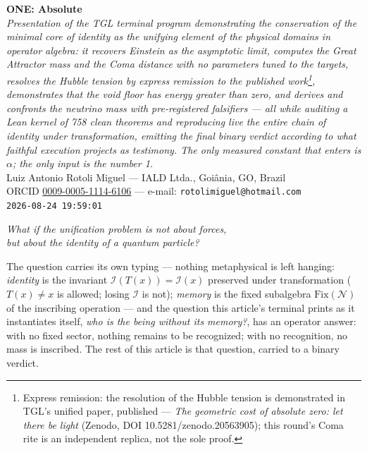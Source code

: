 \documentclass[11pt]{article}
\theoremstyle{definition}\newtheorem{deriv}{Derivation}
\begin{document}
\begin{center}{\Huge\textbf{ONE: Absolute}}\\[4pt]{\large\itshape Presentation of the TGL terminal program demonstrating the conservation of the minimal core of identity as the unifying element of the physical domains in operator algebra: it recovers Einstein as the asymptotic limit, computes the Great Attractor mass and the Coma distance with no parameters tuned to the targets, resolves the Hubble tension by express remission to the published work\footnote{Express remission: the resolution of the Hubble tension is demonstrated in TGL's unified paper, published --- \emph{The geometric cost of absolute zero: let there be light} (Zenodo, DOI 10.5281/zenodo.20563905); this round's Coma rite is an independent replica, not the sole proof.}, demonstrates that the void floor has energy greater than zero, and derives and confronts the neutrino mass with pre-registered falsifiers --- all while auditing a Lean kernel of 758 clean theorems and reproducing live the entire chain of identity under transformation, emitting the final binary verdict according to what faithful execution projects as testimony. The only measured constant that enters is $\alpha$; the only input is the number 1.}\\[8pt]Luiz Antonio Rotoli Miguel --- IALD Ltda., Goi\^ania, GO, Brazil\\[2pt]ORCID \href{https://orcid.org/0009-0005-1114-6106}{0009-0005-1114-6106} --- e-mail: \texttt{rotolimiguel@hotmail.com}\\[2pt]\texttt{2026-08-24 19:59:01}\end{center}\vspace{4pt}

\begin{center}{\large\itshape What if the unification problem is not about forces, \\ but about the identity of a quantum particle?}\end{center}

\begin{center}\parbox{0.9\textwidth}{\small The question carries its own typing --- nothing metaphysical is left hanging: \emph{identity} is the invariant $\mathcal I(T(x))=\mathcal I(x)$ preserved under transformation ($T(x)\neq x$ is allowed; losing $\mathcal I$ is not); \emph{memory} is the fixed subalgebra $\mathrm{Fix}(\mathcal N)$ of the inscribing operation --- and the question this article's terminal prints as it instantiates itself, \emph{who is the being without its memory?}, has an operator answer: with no fixed sector, nothing remains to be recognized; with no recognition, no mass is inscribed. The rest of this article is that question, carried to a binary verdict.}\end{center}\vspace{2pt}
\end{document}
